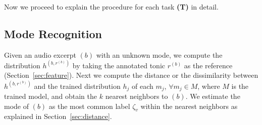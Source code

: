 \documentclass{sig-alternate}
\begin{document}
Now we proceed to explain the procedure for each task {\bf(T)} in detail.

%
%
%
%
%
%
%
%

\subsection{Mode Recognition}\label{sec:mode}
Given an audio excerpt $(b)$ with an unknown mode, we compute the distribution $h^{\left(b, r^{(b)}\right)}$ by taking the annotated tonic $r^{(b)}$ as the reference (Section~\ref{sec:feature}). Next we compute the distance or the dissimilarity between $h^{\left(b, r^{(b)}\right)}$ and the trained distribution $h_j$ of each $m_j$, $\forall m_j \in M$, where $M$ is the trained model, and obtain the $k$ nearest neighbors to $(b)$. We estimate the mode of $(b)$ as the most common label $\zeta_v$ within the nearest neighbors as explained in Section~\ref{sec:distance}.
\end{document}
